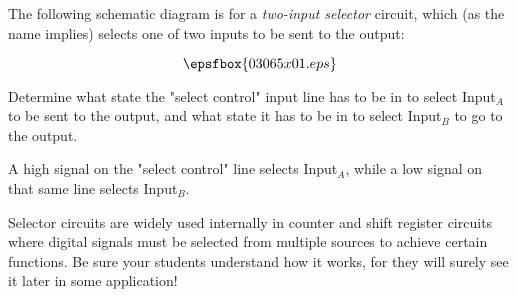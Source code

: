 

The following schematic diagram is for a {\it two-input selector} circuit, which (as the name implies) selects one of two inputs to be sent to the output:

$$\epsfbox{03065x01.eps}$$

Determine what state the "select control" input line has to be in to select Input$_{A}$ to be sent to the output, and what state it has to be in to select Input$_{B}$ to go to the output.







A high signal on the "select control" line selects Input$_{A}$, while a low signal on that same line selects Input$_{B}$.







Selector circuits are widely used internally in counter and shift register circuits where digital signals must be selected from multiple sources to achieve certain functions.  Be sure your students understand how it works, for they will surely see it later in some application!




